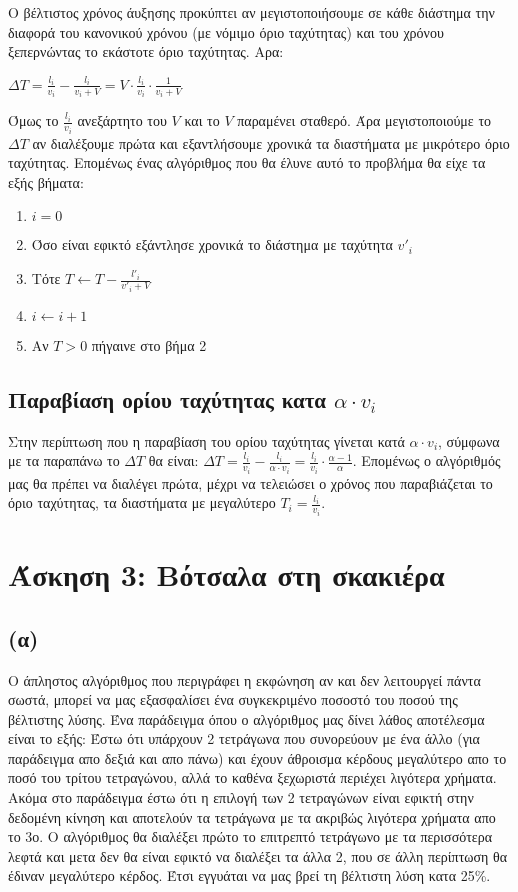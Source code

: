 \documentclass[a4paper,12pt]{report}
\begin{document}
Ο βέλτιστος χρόνος άυξησης προκύπτει αν μεγιστοποιήσουμε σε κάθε διάστημα την διαφορά του κανονικού χρόνου (με νόμιμο όριο ταχύτητας) και του χρόνου ξεπερνώντας το εκάστοτε όριο ταχύτητας. Αρα:
\begin{center}
$\Delta T = \frac{l_i}{v_i} - \frac{l_i}{v_i+V} = V \cdot \frac{l_i}{v_i} \cdot \frac{1}{v_i+V}$
\end{center}
Όμως το $\frac{l_i}{v_i}$ ανεξάρτητο του $V$ και το $V$ παραμένει σταθερό. Άρα μεγιστοποιούμε το $\Delta T$ αν διαλέξουμε πρώτα και εξαντλήσουμε χρονικά τα διαστήματα με μικρότερο όριο ταχύτητας. Επομένως ένας αλγόριθμος που θα έλυνε αυτό το προβλήμα θα είχε τα εξής βήματα:
\begin{enumerate}
 \item $i=0$
 \item Όσο είναι εφικτό εξάντλησε χρονικά το διάστημα με ταχύτητα $v'_i$
 \item Τότε $T \gets T-\frac{l'_i}{v'_i+V}$
 \item $i \gets i+1$
 \item Αν $T>0$ πήγαινε στο βήμα 2
\end{enumerate}

\subsection*{Παραβίαση ορίου ταχύτητας κατα $\alpha \cdot v_i$}
Στην περίπτωση που η παραβίαση του ορίου ταχύτητας γίνεται κατά $\alpha \cdot v_i$, σύμφωνα με τα παραπάνω το $\Delta T$ θα είναι: $\Delta T = \frac{l_i}{v_i} - \frac{l_i}{\alpha \cdot v_i} = \frac{l_i}{v_i} \cdot \frac{\alpha-1}{\alpha}$. Επομένως ο αλγόριθμός μας θα πρέπει να διαλέγει πρώτα, μέχρι να τελειώσει ο χρόνος που παραβιάζεται το όριο ταχύτητας, τα διαστήματα με μεγαλύτερο $T_i=\frac{l_i}{v_i}$.     

\section*{Άσκηση 3: Βότσαλα στη σκακιέρα}
\subsection*{(α)}
Ο άπληστος αλγόριθμος που περιγράφει η εκφώνηση αν και δεν λειτουργεί πάντα σωστά, μπορεί να μας εξασφαλίσει ένα συγκεκριμένο ποσοστό του ποσού της βέλτιστης λύσης. Ένα παράδειγμα όπου ο αλγόριθμος μας δίνει λάθος αποτέλεσμα είναι το εξής: Έστω ότι υπάρχουν 2 τετράγωνα που συνορεύουν με ένα άλλο (για παράδειγμα απο δεξιά και απο πάνω) και έχουν άθροισμα κέρδους μεγαλύτερο απο το ποσό του τρίτου τετραγώνου, αλλά το καθένα ξεχωριστά περιέχει λιγότερα χρήματα. Ακόμα στο παράδειγμα έστω ότι η επιλογή των 2 τετραγώνων είναι εφικτή στην δεδομένη κίνηση και αποτελούν τα τετράγωνα με τα ακριβώς λιγότερα χρήματα απο το 3ο. Ο αλγόριθμος θα διαλέξει πρώτο το επιτρεπτό τετράγωνο με τα περισσότερα λεφτά και μετα δεν θα είναι εφικτό να διαλέξει τα άλλα 2, που σε άλλη περίπτωση θα έδιναν μεγαλύτερο κέρδος. Έτσι εγγυάται να μας βρεί τη βέλτιστη λύση κατα 25\%.    
\end{document}
